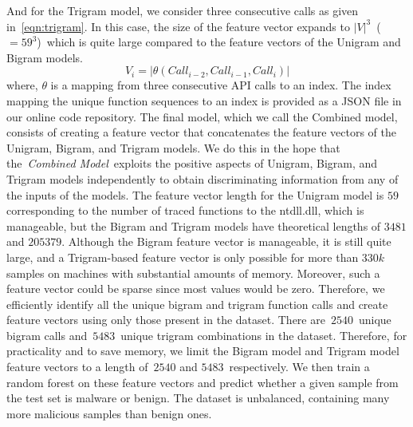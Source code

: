 And for the Trigram model, we consider three consecutive calls as given in~\autoref{eqn:trigram}. In this case, the size of the feature vector expands to $|V|^3$~($=59^3$)~which is quite large compared to the feature vectors of the Unigram and Bigram models.
\begin{equation}
    V_i = |\theta(Call_{i-2},Call_{i-1},Call_{i})|
    \label{eqn:trigram}
\end{equation}
where,
$\theta$ is a mapping from three consecutive API calls to an index.
The index mapping the unique function sequences to an index is provided as a JSON file in our online code repository.
The final model, which we call the Combined model, consists of creating a feature vector that concatenates the feature vectors of the Unigram, Bigram, and Trigram models. 
We do this in the hope that the~\textit{Combined Model}~exploits the positive aspects of Unigram, Bigram, and Trigram models independently to obtain discriminating information from any of the inputs of the models.
The feature vector length for the Unigram model is $59$ corresponding to the number of traced functions to the ntdll.dll, which is manageable, but the Bigram and Trigram models have theoretical lengths of $3481$ and $205379$. 
Although the Bigram feature vector is manageable, it is still quite large, and a Trigram-based feature vector is only possible for more than $330k$ samples on machines with substantial amounts of memory.
Moreover, such a feature vector could be sparse since most values would be zero. 
Therefore, we efficiently identify all the unique bigram and trigram function calls and create feature vectors using only those present in the dataset.
There are~$2540$~unique bigram calls and~$5483$~unique trigram combinations in the dataset.
Therefore, for practicality and to save memory, we limit the Bigram model and Trigram model feature vectors to a length of~$2540$ and $ 5483$~respectively.
We then train a random forest on these feature vectors and predict whether a given sample from the test set is malware or benign.
The dataset is unbalanced, containing many more malicious samples than benign ones.

